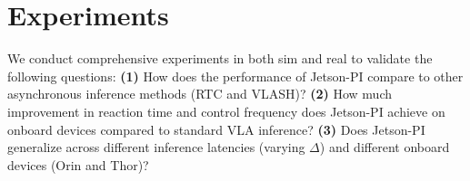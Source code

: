 \section{Experiments}

We conduct comprehensive experiments in both sim and real to validate the following questions:
\textbf{(1)} How does the performance of Jetson-PI compare to other asynchronous inference methods (RTC and VLASH)?
\textbf{(2)} How much improvement in reaction time and control frequency does Jetson-PI achieve on onboard devices compared to standard VLA inference?
\textbf{(3)} Does Jetson-PI generalize across different inference latencies (varying 
$\Delta$) and different onboard devices (Orin and Thor)?





